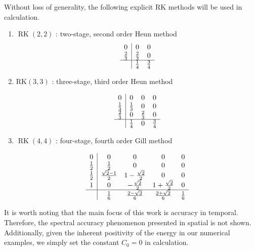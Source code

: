 \documentclass[preprint,compress,3p,10pt,fleqn]{elsarticle}
\numberwithin{equation}{section}
\begin{document}
Without loss of generality, the following explicit RK methods will be used in calculation.
\begin{enumerate}
\item $\operatorname{RK}(2,2)$ : two-stage, second order Heun method %
\begin{equation}
\begin{array}{c|cc}
0 & 0 & 0 \\
\frac{2}{3} & \frac{2}{3} & 0 \\
\hline & \frac{1}{4} & \frac{3}{4}
\end{array}
\end{equation}
	
\item $\mathrm{RK}(3,3)$ : three-stage, third order Heun method %
	
\begin{equation}
\begin{array}{c|ccc}
0 & 0 & 0 & 0 \\
\frac{1}{3} & \frac{1}{3} & 0 & 0 \\
\frac{2}{3} & 0 & \frac{2}{3} & 0 \\
\hline & \frac{1}{4} & 0 & \frac{3}{4}
\end{array}
\end{equation}
		
\item $\operatorname{RK}(4,4)$ : four-stage, fourth order Gill method %
		
\begin{equation}
\begin{array}{c|cccc}
0 & 0 & 0 & 0 & 0 \\
\frac{1}{2} & \frac{1}{2} & 0 & 0 & 0 \\
\frac{1}{2} & \frac{\sqrt{2}-1}{2} & 1-\frac{\sqrt{2}}{2} & 0 & 0 \\
1 & 0 & -\frac{\sqrt{2}}{2} & 1+\frac{\sqrt{2}}{2} & 0 \\
\hline & \frac{1}{6} & \frac{2-\sqrt{2}}{6} & \frac{2+\sqrt{2}}{6} & \frac{1}{6}
\end{array}
\end{equation}
\end{enumerate}
	
It is worth noting that the main focus of this work is accuracy in
temporal. Therefore, the spectral accuracy phenomenon presented in spatial is not shown.
Additionally, given the inherent positivity of the energy in our numerical examples, we simply set the constant $C_0 = 0$ in calculation. 
\end{document}
